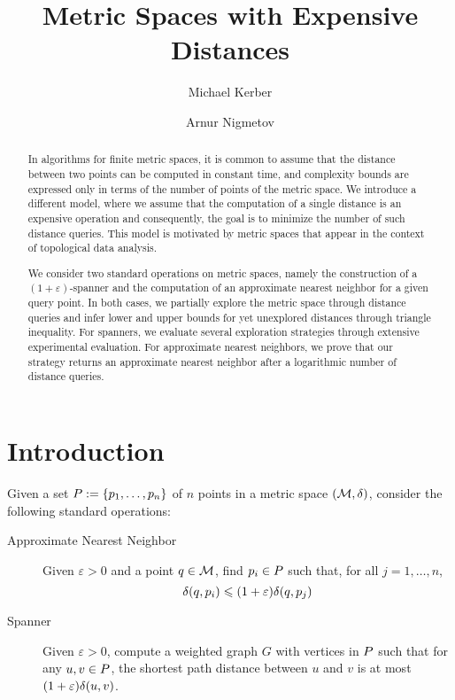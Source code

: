 \documentclass[]{ws-ijcga}
\title{Metric Spaces with Expensive Distances}
\author{Michael Kerber}
\author{Arnur Nigmetov}
\renewcommand{\leq}{\leqslant}
\newcommand{\eps}{\varepsilon}
\begin{document}
\maketitle

\begin{abstract}
In algorithms for finite metric spaces, it is common
to assume that the distance between two points
can be computed in constant time, and complexity
bounds are expressed only in terms of the number
of points of the metric space.
We introduce a different model, where we assume
that the computation of a single distance is
an expensive operation and consequently, the goal is
to minimize the number of such distance queries.
This model is motivated by metric spaces
that appear in the context of topological data analysis.

We consider two standard operations on metric spaces,
namely the construction of a $(1+\eps)$-spanner
and the computation of an approximate nearest
neighbor for a given query point.
In both cases, we partially explore the metric space
through distance queries and infer lower and upper bounds
for yet unexplored distances through triangle inequality.
For spanners, we evaluate several exploration strategies
through extensive experimental evaluation.
For approximate nearest neighbors, we prove that our
strategy returns an approximate nearest neighbor
after a logarithmic number of distance queries.
\end{abstract}

\section{Introduction}

Given a set $P:=\{p_1,\ldots,p_n\}$ of $n$ points
in a metric space $(\mathcal{M},\delta)$, 
consider the following standard operations:

\begin{description}
\item[Approximate Nearest Neighbor] Given $\eps>0$ and a point $q\in\mathcal{M}$,
find $p_i\in P$ such that, for all $j=1,\ldots,n$,
\[\dist(q,p_i)\leq(1+\eps)\dist(q,p_j)\]

\item[Spanner] Given $\eps>0$, compute a weighted graph $G$ with vertices in $P$
such that for any $u,v\in P$, the shortest path distance between $u$ and $v$
is at most $(1+\eps)\dist(u,v)$.
\end{description}
\end{document}
